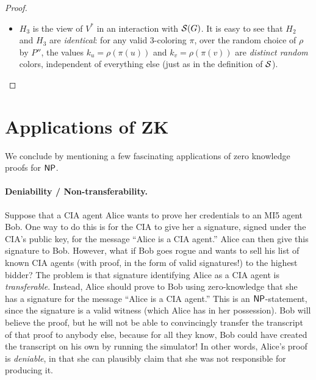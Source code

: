 \documentclass[11pt]{article}
\begin{document}
\begin{proof}
\begin{itemize}
    Using the computational hiding property of the commitment scheme,
    one can show that $H_{1} \compind H_{2}$.  To do this formally, we
    would actually consider a sequence of ``sub-hybrids'' in which one
    color $k_{i}$ at a time is changed from its ``true'' value
    $\rho(\pi(i))$ (as in $H_{1}$) to its ``simulated'' value $1$ (as
    in $H_{2}$).
    This reduction uses the stronger hiding assumption in \cref{thm:zkp-np}: to simulate the other commitments, it is given~$G$ and~$\pi$ as polynomial-length advice.
    A hypothetical distinguisher for the views can thereby be converted into a non-uniform distinguisher against the commitment scheme.
    This advice is used only in the security reduction; the verifier~$V^{*}$ and the simulator $\Sim^{V^{*}}(G)$ remain uniform PPT algorithms.

  \item $H_{3}$ is the view of $V^{*}$ in an interaction with
    $\mathcal{S}(G)$.  It is easy to see that $H_{2}$ and $H_{3}$ are
    \emph{identical}: for any valid $3$-coloring $\pi$, over the
    random choice of $\rho$ by $P''$, the values $k_{u} =
    \rho(\pi(u))$ and $k_{v} = \rho(\pi(v))$ are \emph{distinct
      random} colors, independent of everything else (just as in the
    definition of $\mathcal{S}$).
  \end{itemize}
\end{proof}

\section{Applications of ZK}
\label{sec:applications-zk}

We conclude by mentioning a few fascinating applications of zero
knowledge proofs for $\mathsf{NP}$.

\paragraph{Deniability / Non-transferability.}

Suppose that a CIA agent Alice wants to prove her credentials to an
MI5 agent Bob.  One way to do this is for the CIA to give her a
signature, signed under the CIA's public key, for the message ``Alice
is a CIA agent.''  Alice can then give this signature to Bob.
However, what if Bob goes rogue and wants to sell his list of known
CIA agents (with proof, in the form of valid signatures!) to the
highest bidder?  The problem is that signature identifying Alice as a
CIA agent is \emph{transferable}.  Instead, Alice should prove to Bob
using zero-knowledge that she has a signature for the message ``Alice
is a CIA agent.''  This is an $\mathsf{NP}$-statement, since the signature is
a valid witness (which Alice has in her possession).  Bob will believe
the proof, but he will not be able to convincingly transfer the
transcript of that proof to anybody else, because for all they know,
Bob could have created the transcript on his own by running the
simulator!  In other words, Alice's proof is \emph{deniable}, in that
she can plausibly claim that she was not responsible for producing it.
\end{document}
